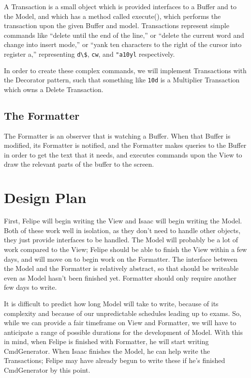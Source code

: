 \documentclass[12pt]{article}
\begin{document}
A Transaction is a small object which is provided interfaces to a Buffer and to the Model,
and which has a method called execute(), which performs the transaction upon the given
Buffer and model. Transactions represent simple commands like ``delete until the end of the line,''
or ``delete the current word and change into insert mode,'' or ``yank ten characters to the right
of the cursor into register a,'' representing \verb|d\$|, \verb|cw|, and \verb|"a10yl| respectively.

In order to create these complex commands, we will implement Transactions with the Decorator pattern,
such that something like \verb|10d| is a Multiplier Transaction which owns a Delete Transaction.

\subsection{The Formatter}

The Formatter is an observer that is watching a Buffer. When that Buffer is modified, its Formatter
is notified, and the Formatter makes queries to the Buffer in order to get the text that it needs,
and executes commands upon the View to draw the relevant parts of the buffer to the screen.

\section{Design Plan}

First, Felipe will begin writing the View and Isaac will begin writing the Model. Both of these work
well in isolation, as they don't need to handle other objects, they just provide interfaces to be handled.
The Model will probably be a lot of work compared to the View; Felipe should be able to finish the View
within a few days, and will move on to begin work on the Formatter. The interface between the Model and the
Formatter is relatively abstract, so that should be writeable even as Model hasn't been finished yet.
Formatter should only require another few days to write.

It is difficult to predict how long Model will take to write, because of its complexity and because of our
unpredictable schedules leading up to exams. So, while we can provide a fair timeframe on View and Formatter,
we will have to anticipate a range of possible durations for the development of Model. With this in mind,
when Felipe is finished with Formatter, he will start writing CmdGenerator. When Isaac finishes the Model, he
can help write the Transactions; Felipe may have already begun to write these if he's finished CmdGenerator
by this point.
\end{document}
